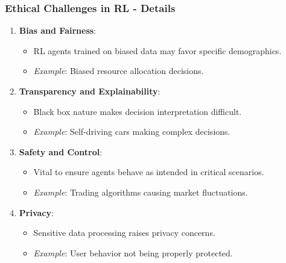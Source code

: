 \documentclass[aspectratio=169]{beamer}
\begin{document}
\begin{frame}[fragile]
    \frametitle{Ethical Challenges in RL - Details}
    \begin{enumerate}
        \item \textbf{Bias and Fairness}:
            \begin{itemize}
                \item RL agents trained on biased data may favor specific demographics.
                \item \textit{Example}: Biased resource allocation decisions.
            \end{itemize}
        
        \item \textbf{Transparency and Explainability}:
            \begin{itemize}
                \item Black box nature makes decision interpretation difficult.
                \item \textit{Example}: Self-driving cars making complex decisions.
            \end{itemize}
        
        \item \textbf{Safety and Control}:
            \begin{itemize}
                \item Vital to ensure agents behave as intended in critical scenarios.
                \item \textit{Example}: Trading algorithms causing market fluctuations.
            \end{itemize}
        
        \item \textbf{Privacy}:
            \begin{itemize}
                \item Sensitive data processing raises privacy concerns.
                \item \textit{Example}: User behavior not being properly protected.
            \end{itemize}
    \end{enumerate}
\end{frame}
\end{document}
